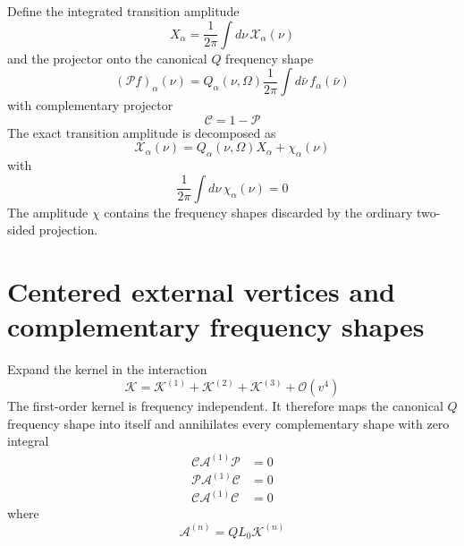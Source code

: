 \documentclass[aip,jcp,reprint,noshowkeys,superscriptaddress]{revtex4-1}
\begin{document}
Define the integrated transition amplitude
\begin{equation}
	X_\alpha
	=
	\frac{1}{2\pi}
	\int d\nu\,
	\mathcal X_\alpha(\nu)
	\label{eq:X_def}
\end{equation}
and the projector onto the canonical $Q$ frequency shape
\begin{equation}
	(\mathcal P f)_\alpha(\nu)
	=
	Q_\alpha(\nu,\Omega)
	\frac{1}{2\pi}
	\int d\bar\nu\,
	f_\alpha(\bar\nu)
	\label{eq:P_def}
\end{equation}
with complementary projector
\begin{equation}
	\mathcal C
	=
	1-\mathcal P
	\label{eq:C_projector}
\end{equation}
The exact transition amplitude is decomposed as
\begin{equation}
	\mathcal X_\alpha(\nu)
	=
	Q_\alpha(\nu,\Omega)X_\alpha
	+
	\chi_\alpha(\nu)
	\label{eq:X_decomposition}
\end{equation}
with
\begin{equation}
	\frac{1}{2\pi}
	\int d\nu\,
	\chi_\alpha(\nu)
	=
	0
	\label{eq:chi_zero_average}
\end{equation}
The amplitude $\chi$ contains the frequency shapes discarded by the ordinary two-sided projection.

\section[Centered external vertices]{Centered external vertices and complementary frequency shapes}
\label{sec:centered_vertices}

Expand the kernel in the interaction
\begin{equation}
	\mathcal K
	=
	\mathcal K^{(1)}
	+
	\mathcal K^{(2)}
	+
	\mathcal K^{(3)}
	+
	\mathcal O(v^4)
	\label{eq:K_expansion}
\end{equation}
The first-order kernel is frequency independent.
It therefore maps the canonical $Q$ frequency shape into itself and annihilates every complementary shape with zero integral
\begin{align}
	\mathcal C\mathcal A^{(1)}\mathcal P
	&=
	0
	\\
	\mathcal P\mathcal A^{(1)}\mathcal C
	&=
	0
	\\
	\mathcal C\mathcal A^{(1)}\mathcal C
	&=
	0
	\label{eq:first_order_decoupling}
\end{align}
where
\begin{equation}
	\mathcal A^{(n)}
	=
	Q L_0\mathcal K^{(n)}
	\label{eq:A_def}
\end{equation}
\end{document}
